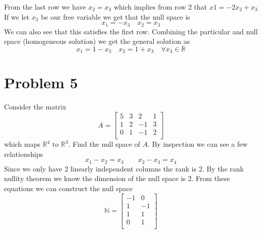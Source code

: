 \documentclass{article}
\begin{document}
From the last row we have
$ x_2 = x_3 $
which implies from row 2 that
$ x1 = -2x_2 + x_3 $
If we let $x_3$ be our free variable we get that the null space is
$$ x_1 = -x_3 \quad x_2 = x_3 $$
We can also see that this satisfies the first row.
Combining the particular and null space (homogeneous solution) we get the general solution as
$$ x_1 = 1-x_3 \quad x_2 = 1 + x_3 \quad \forall x_3 \in \mathbb{R} $$

\section*{Problem 5}
Consider the matrix
$$
A=
\begin{bmatrix}
5 & 3 & 2 & 1 \\
1 & 2 & -1 & 3 \\
0 & 1 & -1 & 2 \\
\end{bmatrix}
$$
which maps $\mathbb{R}^4$ to $\mathbb{R}^3$. Find the null space of $A$.
\newline
\newline
By inspection we can see a few relationships
$$ x_1 - x_2 = x_3 \qquad x_2 - x_3 = x_4 $$
Since we only have 2 linearly independent columns the rank is 2.
By the rank nullity theorem we know the dimension of the null space is 2.
From these equations we can construct the null space
$$
\mathbb{N} =
\begin{bmatrix}
-1 &  0 \\
 1 & -1 \\
 1 &  1 \\
 0 &  1 \\
\end{bmatrix}
$$
\end{document}
